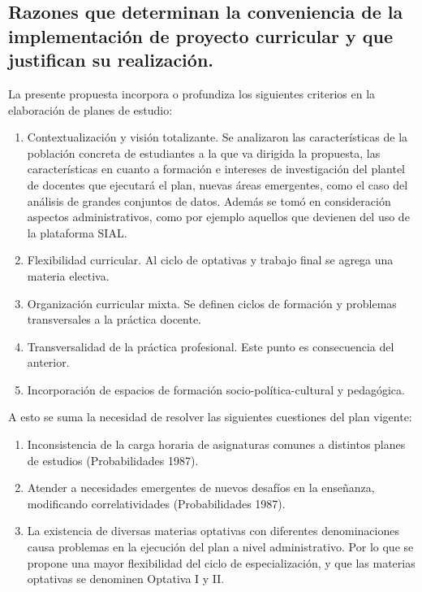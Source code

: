 \documentclass[a4paper, 12pt]{article}
\begin{document}
\subsection{Razones que determinan la conveniencia de la implementación de proyecto curricular  y que justifican su realización.}

La presente propuesta incorpora o profundiza los siguientes criterios en la elaboración de planes de estudio: 

\begin{enumerate}
\item  Contextualización y visión totalizante. Se analizaron las características de la población concreta de estudiantes a la que va dirigida la propuesta, las características en cuanto a formación e intereses de investigación del plantel de docentes que ejecutará el plan, nuevas áreas emergentes, como el caso del análisis de grandes conjuntos de datos. Además se tomó en consideración aspectos administrativos, como por ejemplo aquellos que devienen del uso de la plataforma SIAL. 
\item Flexibilidad curricular. Al ciclo de optativas y trabajo final se agrega una materia electiva.
\item Organización curricular mixta. Se definen ciclos de formación y problemas transversales a la práctica docente. 
\item Transversalidad de la práctica profesional. Este punto es consecuencia del anterior.
\item Incorporación de espacios de formación socio-política-cultural y pedagógica.
\end{enumerate}

A esto se suma la necesidad de resolver las siguientes cuestiones  del plan vigente: 

\begin{enumerate}
\item Inconsistencia de la carga horaria de asignaturas  comunes a distintos planes de estudios (Probabilidades 1987).

\item Atender a necesidades emergentes de nuevos desafíos en la enseñanza, modificando correlatividades (Probabilidades 1987). 

\item La existencia de diversas materias optativas con diferentes denominaciones causa problemas en la ejecución del plan a nivel administrativo. Por lo que se propone una mayor flexibilidad del ciclo de especialización, y  que las materias optativas  se denominen Optativa I y II. 
\end{enumerate}
\end{document}
